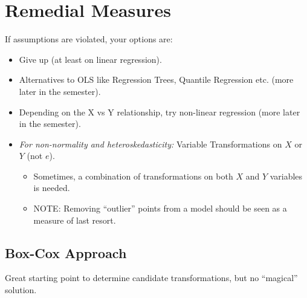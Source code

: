 \documentclass[12pt]{notes}
\begin{document}
\section{Remedial Measures}

If assumptions are violated, your options are:
\begin{itemize}
\item Give up (at least on linear regression). 
\item Alternatives to OLS like Regression Trees, Quantile Regression etc. (more later in the semester). 
\item Depending on the X vs Y relationship, try non-linear regression (more later in the semester). 
\item \textit{For non-normality and heteroskedasticity:} Variable Transformations on $X$ or $Y$ (not $e$). 
\begin{itemize}
\item Sometimes, a combination of transformations on both $X$ and $Y$ variables is needed. 
\item NOTE: Removing ``outlier'' points from a model should be seen as a measure of last resort. 
\end{itemize}
\end{itemize}

\subsection*{Box-Cox Approach}
Great starting point to determine candidate transformations, but no ``magical'' solution. 
\end{document}

